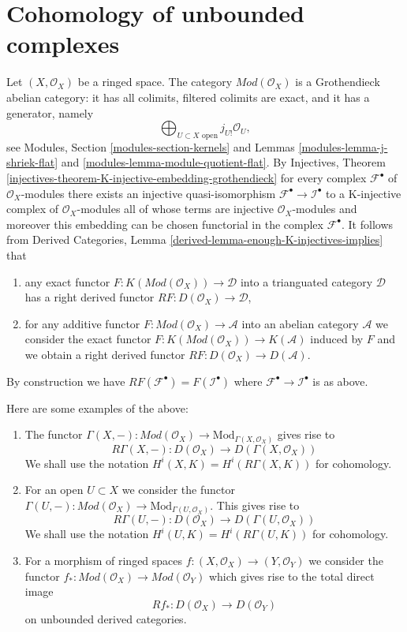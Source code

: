 \section{Cohomology of unbounded complexes}
\label{section-unbounded}

\noindent
Let $(X, \mathcal{O}_X)$ be a ringed space.
The category $\textit{Mod}(\mathcal{O}_X)$ is a Grothendieck
abelian category: it has all colimits,
filtered colimits are exact, and it has a generator, namely
$$
\bigoplus\nolimits_{U \subset X\text{ open}} j_{U!}\mathcal{O}_U,
$$
see Modules, Section \ref{modules-section-kernels} and
Lemmas \ref{modules-lemma-j-shriek-flat} and
\ref{modules-lemma-module-quotient-flat}.
By Injectives, Theorem
\ref{injectives-theorem-K-injective-embedding-grothendieck}
for every complex $\mathcal{F}^\bullet$ of $\mathcal{O}_X$-modules
there exists an injective quasi-isomorphism
$\mathcal{F}^\bullet \to \mathcal{I}^\bullet$ to a K-injective complex
of $\mathcal{O}_X$-modules all of whose terms are injective
$\mathcal{O}_X$-modules and moreover this embedding can be
chosen functorial in the complex $\mathcal{F}^\bullet$.
It follows from
Derived Categories, Lemma \ref{derived-lemma-enough-K-injectives-implies}
that
\begin{enumerate}
\item any exact functor $F : K(\textit{Mod}(\mathcal{O}_X)) \to \mathcal{D}$
into a trianguated category $\mathcal{D}$ has a right derived functor
$RF : D(\mathcal{O}_X) \to \mathcal{D}$,
\item for any additive functor
$F : \textit{Mod}(\mathcal{O}_X) \to \mathcal{A}$
into an abelian category $\mathcal{A}$ we consider the exact functor
$F : K(\textit{Mod}(\mathcal{O}_X)) \to K(\mathcal{A})$ induced by $F$
and we obtain a right derived functor
$RF : D(\mathcal{O}_X) \to D(\mathcal{A})$.
\end{enumerate}
By construction we have $RF(\mathcal{F}^\bullet) = F(\mathcal{I}^\bullet)$
where $\mathcal{F}^\bullet \to \mathcal{I}^\bullet$ is as above.

\medskip\noindent
Here are some examples of the above:
\begin{enumerate}
\item The functor $\Gamma(X, -) : \textit{Mod}(\mathcal{O}_X) \to
\text{Mod}_{\Gamma(X, \mathcal{O}_X)}$ gives rise to
$$
R\Gamma(X, -) : D(\mathcal{O}_X) \to D(\Gamma(X, \mathcal{O}_X))
$$
We shall use the notation $H^i(X, K) = H^i(R\Gamma(X, K))$ for cohomology.
\item For an open $U \subset X$ we consider the functor
$\Gamma(U, -) : \textit{Mod}(\mathcal{O}_X) \to
\text{Mod}_{\Gamma(U, \mathcal{O}_X)}$. This gives rise to
$$
R\Gamma(U, -) : D(\mathcal{O}_X) \to D(\Gamma(U, \mathcal{O}_X))
$$
We shall use the notation $H^i(U, K) = H^i(R\Gamma(U, K))$ for cohomology.
\item For a morphism of ringed spaces
$f : (X, \mathcal{O}_X) \to (Y, \mathcal{O}_Y)$ we consider the functor
$f_* : \textit{Mod}(\mathcal{O}_X) \to \textit{Mod}(\mathcal{O}_Y)$
which gives rise to the total direct image
$$
Rf_* : D(\mathcal{O}_X) \longrightarrow D(\mathcal{O}_Y)
$$
on unbounded derived categories.
\end{enumerate}


